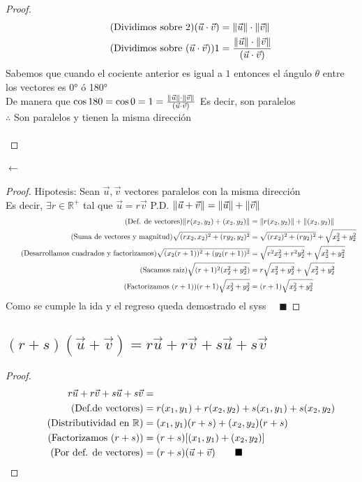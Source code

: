 \documentclass[14pt]{extarticle}
\DeclarePairedDelimiter\norm{\lVert}{\rVert}%
\begin{document}
\begin{proof}
\begin{align}
            \tag{Dividimos sobre 2} (\vec{u}\cdot\vec{v}) &= \norm{\vec{u}} \cdot \norm{\vec{v}} \\
            \tag{Dividimos sobre $(\vec{u}\cdot\vec{v})$} 1 &= \frac{\norm{\vec{u}} \cdot\norm{\vec{v}}}{(\vec{u}\cdot\vec{v})}
        \end{align}
        Sabemos que cuando el cociente anterior es igual a $1$ entonces el ángulo $\theta$ entre los vectores es 0° ó 180° \\
        De manera que $\cos180 = \cos0 = 1 = \frac{\norm{\vec{u}} \cdot\norm{\vec{v}}}{(\vec{u}\cdot\vec{v})}$ Es decir, son paralelos \\
        $\therefore$ Son paralelos y tienen la misma dirección \\ \\
    \end{proof}
    $\leftarrow$ \\
    \begin{proof}
        Hipotesis: Sean $\vec{u},\vec{v}$ vectores paralelos con la misma dirección \\
        Es decir, $\exists r \in \mathbb{R}^+$ tal que $\vec{u} = r\vec{v}$
        P.D. $\norm{\vec{u}+\vec{v}} = \norm{\vec{u}} + \norm{\vec{v}}$
        \begin{align}
            \tag{Def. de vectores}\norm{r(x_2,y_2)+(x_2,y_2)} &= \norm{r(x_2,y_2)} + \norm{(x_2,y_2)} \\
            \tag{Suma de vectores y magnitud} \sqrt{(rx_2,x_2)^2+(ry_2,y_2)^2} &= \sqrt{(rx_2)^2+(ry_2)^2} + \sqrt{x_2^2+y_2^2} \\
            \tag{Desarrollamos cuadrados y factorizamos} \sqrt{(x_2(r+1))^2 + (y_2(r+1))^2} &= \sqrt{r^2x_2^2+r^2y_2^2} + \sqrt{x_2^2+y_2^2} \\
            \tag{Sacamos raiz} \sqrt{(r+1)^2(x_2^2+y_2^2)} &= r\sqrt{x_2^2+y_2^2} + \sqrt{x_2^2+y_2^2} \\
            \tag{Factorizamos $(r+1)$}(r+1)\sqrt{x_2^2+y_2^2} &= (r+1)\sqrt{x_2^2+y_2^2}
        \end{align}
        Como se cumple la ida y el regreso queda demostrado el syss $\quad \blacksquare$
    \end{proof}
    \subsection{$(r+s)(\vec{u}+\vec{v}) = r\vec{u}+r\vec{v}+s\vec{u}+s\vec{v}$}
        \begin{proof}
        \begin{align}
            \notag r\vec{u}+r\vec{v}+s\vec{u}+s\vec{v} &= \\
            \tag{Def.de vectores} &= r(x_1,y_1)+r(x_2,y_2)+s(x_1,y_1)+s(x_2,y_2) \\
            \tag{Distributividad en $\mathbb{R}$} &= (x_1,y_1)(r+s)+(x_2,y_2)(r+s) \\
            \tag{Factorizamos $(r+s)$} &= (r+s)[(x_1,y_1)+(x_2,y_2)] \\
            \tag{Por def. de vectores} &= (r+s)(\vec{u}+\vec{v}) \qquad \blacksquare
        \end{align}
        \end{proof}
\end{document}
